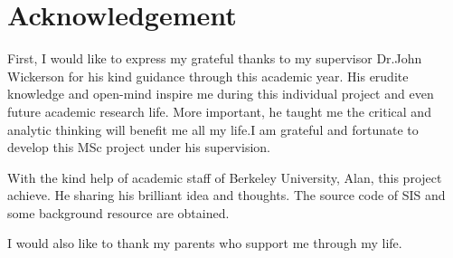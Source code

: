 \renewcommand{\baselinestretch}{1.5}
\chapter{Acknowledgement}
\renewcommand{\baselinestretch}{\mystretch}
First, I would like to express my grateful thanks to my supervisor Dr.John Wickerson for his kind guidance through this academic year. His erudite knowledge and open-mind inspire me during this individual project and even future academic research life. More important, he taught me the critical and analytic thinking will benefit me all my life.I am grateful and fortunate to develop this MSc project under his supervision.

With the kind help of academic staff of Berkeley University, Alan, this project achieve. He sharing his brilliant idea and thoughts. The source code of SIS and some background resource are obtained. 

I would also like to thank my parents who support me through my life.











